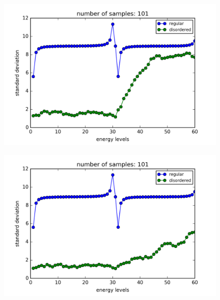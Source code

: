 \begin{figure}[!htbh]
\centering
\begin{minipage}{.45\textwidth}
  \centering
  \includegraphics[width=1.1\linewidth]{standardDeviation/N_31_100a10_well0_4_p_0_5.png}
  \label{fig:disordered sys num 5}
\end{minipage}\qquad
\begin{minipage}{.45\textwidth}
  \centering
  \includegraphics[width=1.1\linewidth]{standardDeviation/N_31_100a10_well0_2_p_0_5.png}
  \label{fig:disordered sys num 6}
\end{minipage}
\end{figure}

